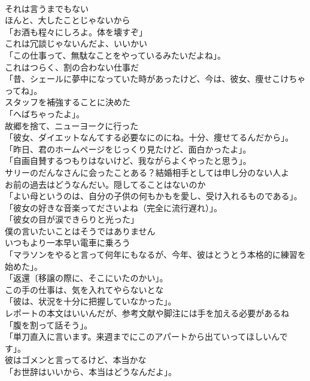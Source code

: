 \documentclass[8pt]{extreport}
\begin{document}
\begin{CJK}{UTF8}{min}
\\	それは言うまでもない	
\\	ほんと、大したことじゃないから	
\\	「お酒も程々にしろよ。体を壊すぞ」	
\\	これは冗談じゃないんだよ、いいかい	
\\	「この仕事って、無駄なことをやっているみたいだよね」。	
\\	これはつらく、割の合わない仕事だ	
\\	「昔、シェールに夢中になっていた時があったけど、今は、彼女、痩せこけちゃってね」。	
\\	スタッフを補強することに決めた	
\\	「へばちゃったよ」。	
\\	故郷を捨て、ニューヨークに行った	
\\	「彼女、ダイエットなんてする必要なにのにね。十分、痩せてるんだから」。	
\\	「昨日、君のホームページをじっくり見たけど、面白かったよ」。	
\\	「自画自賛するつもりはないけど、我ながらよくやったと思う」。	
\\	サリーのだんなさんに会ったことある？結婚相手としては申し分のない人よ	
\\	お前の過去はどうなんだい。隠してることはないのか	
\\	「よい母というのは、自分の子供の何もかもを愛し、受け入れるものである」。	
\\	「彼女の好きな音楽ってださいよね（完全に流行遅れ）」。	
\\	「彼女の目が涙できらりと光った」	
\\	僕の言いたいことはそうではありません	
\\	いつもより一本早い電車に乗ろう	
\\	「マラソンをやると言って何年にもなるが、今年、彼はとうとう本格的に練習を始めた」。	
\\	「返還〔移譲の際に、そこにいたのかい」。	
\\	この手の仕事は、気を入れてやらないとな	
\\	「彼は、状況を十分に把握していなかった」。	
\\	レポートの本文はいいんだが、参考文献や脚注には手を加える必要があるね	
\\	「腹を割って話そう」。	
\\	「単刀直入に言います。来週までにこのアパートから出ていってほしいんです」。	
\\	彼はゴメンと言ってるけど、本当かな	
\\	「お世辞はいいから、本当はどうなんだよ」。	

\end{CJK}
\end{document}
